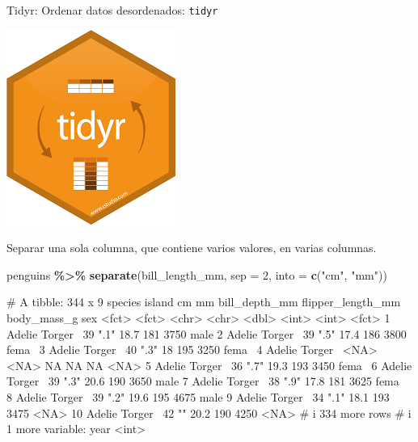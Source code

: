 \documentclass[
  ignorenonframetext,
  aspectratio=169]{beamer}
\newenvironment{Shaded}{\begin{snugshade}}{\end{snugshade}}
\newcommand{\AttributeTok}[1]{\textcolor[rgb]{0.13,0.29,0.53}{#1}}
\newcommand{\DecValTok}[1]{\textcolor[rgb]{0.00,0.00,0.81}{#1}}
\newcommand{\FunctionTok}[1]{\textcolor[rgb]{0.13,0.29,0.53}{\textbf{#1}}}
\newcommand{\NormalTok}[1]{#1}
\newcommand{\SpecialCharTok}[1]{\textcolor[rgb]{0.81,0.36,0.00}{\textbf{#1}}}
\newcommand{\StringTok}[1]{\textcolor[rgb]{0.31,0.60,0.02}{#1}}
\let\oldverbatim\verbatim
\let\endoldverbatim\endverbatim
\renewenvironment{verbatim}{\tiny\oldverbatim}{\endoldverbatim}
\begin{document}
\begin{frame}[fragile]{Tidyr: Ordenar datos desordenados:
\texttt{tidyr}}
\label{tidyr-ordenar-datos-desordenados-tidyr-11}
\begin{flushright}\includegraphics[width=0.05\linewidth]{Imgs/logo_tidyr} \end{flushright}

Separar una sola columna, que contiene varios valores, en varias
columnas.

\begin{Shaded}
\begin{Highlighting}[]
\NormalTok{penguins }\SpecialCharTok{\%\textgreater{}\%} \FunctionTok{separate}\NormalTok{(bill\_length\_mm, }\AttributeTok{sep =} \DecValTok{2}\NormalTok{, }\AttributeTok{into =} \FunctionTok{c}\NormalTok{(}\StringTok{"cm"}\NormalTok{, }\StringTok{"mm"}\NormalTok{))}
\end{Highlighting}
\end{Shaded}

\begin{verbatim}
# A tibble: 344 x 9
   species island  cm    mm    bill_depth_mm flipper_length_mm body_mass_g sex  
   <fct>   <fct>   <chr> <chr>         <dbl>             <int>       <int> <fct>
 1 Adelie  Torger~ 39    ".1"           18.7               181        3750 male 
 2 Adelie  Torger~ 39    ".5"           17.4               186        3800 fema~
 3 Adelie  Torger~ 40    ".3"           18                 195        3250 fema~
 4 Adelie  Torger~ <NA>  <NA>           NA                  NA          NA <NA> 
 5 Adelie  Torger~ 36    ".7"           19.3               193        3450 fema~
 6 Adelie  Torger~ 39    ".3"           20.6               190        3650 male 
 7 Adelie  Torger~ 38    ".9"           17.8               181        3625 fema~
 8 Adelie  Torger~ 39    ".2"           19.6               195        4675 male 
 9 Adelie  Torger~ 34    ".1"           18.1               193        3475 <NA> 
10 Adelie  Torger~ 42    ""             20.2               190        4250 <NA> 
# i 334 more rows
# i 1 more variable: year <int>
\end{verbatim}
\end{frame}
\end{document}
